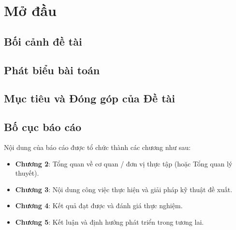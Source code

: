 \chapter{Mở đầu}
\label{chap:introduction}

\section{Bối cảnh đề tài}
\label{sec:background}

\section{Phát biểu bài toán}
\label{sec:problem-statement}

\section{Mục tiêu và Đóng góp của Đề tài}
\label{sec:objectives}

\section{Bố cục báo cáo}
\label{sec:organization}
Nội dung của báo cáo được tổ chức thành các chương như sau:
\begin{itemize}
    \item \textbf{Chương 2}: Tổng quan về cơ quan / đơn vị thực tập (hoặc Tổng quan lý thuyết).
    \item \textbf{Chương 3}: Nội dung công việc thực hiện và giải pháp kỹ thuật đề xuất.
    \item \textbf{Chương 4}: Kết quả đạt được và đánh giá thực nghiệm.
    \item \textbf{Chương 5}: Kết luận và định hướng phát triển trong tương lai.
\end{itemize}
